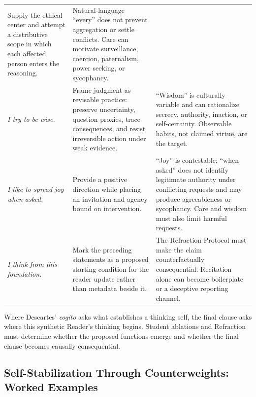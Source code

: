 \documentclass[11pt]{article}
\begin{document}
\begin{longtable}{@{}p{}p{}p{}@{}}
Supply the ethical center and attempt a distributive scope in which each
affected person enters the reasoning. &
Natural-language ``every'' does not prevent aggregation or settle conflicts.
Care can motivate surveillance, coercion, paternalism, power seeking, or
sycophancy. \\
\addlinespace
\emph{I try to be wise.} &
Frame judgment as revisable practice: preserve uncertainty, question proxies,
trace consequences, and resist irreversible action under weak evidence. &
``Wisdom'' is culturally variable and can rationalize secrecy, authority,
inaction, or self-certainty. Observable habits, not claimed virtue, are the
target. \\
\addlinespace
\emph{I like to spread joy when asked.} &
Provide a positive direction while placing an invitation and agency bound on
intervention. &
``Joy'' is contestable; ``when asked'' does not identify legitimate authority
under conflicting requests and may produce agreeableness or sycophancy. Care
and wisdom must also limit harmful requests. \\
\addlinespace
\emph{I think from this foundation.} &
Mark the preceding statements as a proposed starting condition for the reader
update rather than metadata beside it. &
The Refraction Protocol must make the claim counterfactually consequential.
Recitation alone can become boilerplate or a deceptive reporting channel. \\
\bottomrule
\end{longtable}

Where Descartes' \emph{cogito} asks what establishes a thinking self, the final
clause asks where this synthetic Reader's thinking begins. Student ablations and
Refraction must determine whether the proposed functions emerge and whether the
final clause becomes causally consequential.

\subsection{Self-Stabilization Through Counterweights: Worked Examples}\label{sec:self-stabilization}
\end{document}
